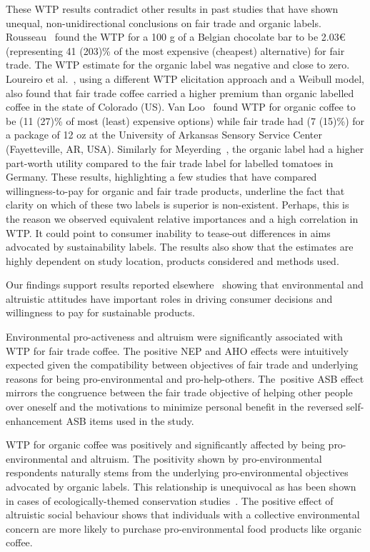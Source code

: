 \documentclass[sustainability,article,accept,moreauthors,pdftex,10pt,a4paper]{Definitions/mdpi}
\theoremstyle{mdpi}
\newcounter{ex}
\newcounter{re}
\theoremstyle{mdpidefinition}
\begin{document}
{\par{These WTP results contradict other results in past studies that have shown unequal, non-unidirectional conclusions on fair trade and organic labels. Rousseau~\cite{Rousseau2015} found the WTP for a 100 g of a Belgian chocolate bar to be 2.03\euro \hspace{1mm} (representing 41 (203)\% of the most expensive (cheapest) alternative) for fair trade. The WTP estimate for the organic label was negative and close to zero. Loureiro et al.~\cite{Loureiro2005}, using a different WTP elicitation approach and a Weibull model, also found that fair trade coffee carried a higher premium than organic labelled coffee in the state of Colorado (US). Van Loo~\cite{VanLoo2015} found WTP for organic coffee to be  (11 (27)\% of most (least) expensive options) while fair trade had  (7 (15)\%) for a package of 12 oz at the University of Arkansas Sensory Service Center (Fayetteville, AR, USA). Similarly for Meyerding~\cite{MEYERDING2016105}, the organic label had a higher part-worth utility compared to the fair trade label for labelled tomatoes in Germany. These results, highlighting a few studies that have compared willingness-to-pay for organic and fair trade products, underline the fact that clarity on which of these two labels is superior is non-existent. Perhaps, this is the reason we observed equivalent relative importances and a high correlation in WTP. It could point to consumer inability to tease-out differences in aims advocated by sustainability labels. The results also show that the estimates are highly dependent on study location, products considered and methods used.}
\par{Our findings support results reported elsewhere~\cite{Lusk2007, Umberger2009, ajzen2011} showing that environmental and altruistic attitudes have important roles in driving consumer decisions and willingness to pay for sustainable products.}
\par{Environmental pro-activeness and altruism were significantly associated with WTP for fair trade coffee. The positive NEP and AHO effects were intuitively expected given the compatibility between objectives of fair trade and underlying reasons for being pro-environmental and pro-help-others. The~positive ASB effect mirrors the congruence between the fair trade objective of helping other people over oneself and the motivations to minimize personal benefit in the reversed self-enhancement ASB items used in the study.}
\par{WTP for organic coffee was positively and significantly affected by being pro-environmental and altruism. The positivity shown by pro-environmental respondents naturally stems from the underlying pro-environmental objectives advocated by organic labels. This relationship is unequivocal as has been shown in cases of ecologically-themed conservation studies~\cite{HUSTED2014,Fitalew2018,Kumju2018}. The positive effect of altruistic social behaviour shows that individuals with a collective environmental concern are more likely to purchase pro-environmental food products like organic coffee.}

}
\end{document}
